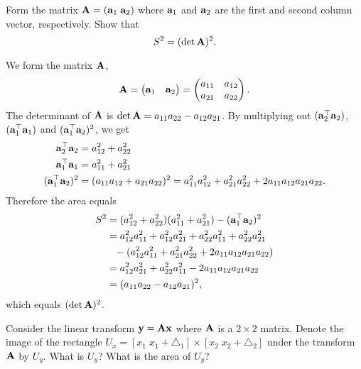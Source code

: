 \begin{exenumerate}
\begin{solution}
  \end{solution}
  
\item Form the matrix $\mathbf{A}=(\mathbf{a}_1 \; \mathbf{a}_2)$ where $\mathbf{a}_1$ and $\mathbf{a}_2$ are
  the first and second column vector, respectively. Show that
  \begin{equation}
    S^2 = (\det \mathbf{A})^2.
  \end{equation}
  
  
  \begin{solution}
    We form the matrix $\mathbf{A}$,
    \begin{equation}
      \mathbf{A} = \begin{pmatrix} \mathbf{a}_1 & \mathbf{a}_2
           \end{pmatrix}  =
           \begin{pmatrix} a_{11} & a_{12} \\ a_{21} & a_{22}
           \end{pmatrix}.
    \end{equation}
    The determinant of $\mathbf{A}$ is $\det \mathbf{A} = a_{11}a_{22} - a_{12}a_{21}$. By multiplying out $(\mathbf{a}_2^\top\mathbf{a}_2)$, $(\mathbf{a}_1^\top\mathbf{a}_1)$ and 
    $(\mathbf{a}_1^\top\mathbf{a}_2)^2$, we get
    \begin{align}
      \mathbf{a}_2^\top\mathbf{a}_2 	&= a_{12}^2 + a_{22}^2 \\ 
      \mathbf{a}_1^\top\mathbf{a}_1 	&= a_{11}^2 + a_{21}^2 \\
      (\mathbf{a}_1^\top\mathbf{a}_2)^2 	&= (a_{11}a_{12} + a_{21}a_{22})^2 = a_{11}^2a_{12}^2 + a_{21}^2a_{22}^2 + 2a_{11}a_{12}a_{21}a_{22}.
    \end{align}
    Therefore the area equals
    \begin{align}
      S^2 &= (a_{12}^2 + a_{22}^2)(a_{11}^2 + a_{21}^2) - (\mathbf{a}_1^\top\mathbf{a}_2)^2 \\
          &= a_{12}^2a_{11}^2 + a_{12}^2a_{21}^2 + a_{22}^2a_{11}^2 + a_{22}^2a_{21}^2 \nonumber\\
          &\phantom{=}- (a_{12}^2a_{11}^2 + a_{21}^2a_{22}^2 + 2a_{11}a_{12}a_{21}a_{22}) \\
          &= a_{12}^2a_{21}^2 + a_{22}^2a_{11}^2 - 2a_{11}a_{12}a_{21}a_{22} \\
          &= (a_{11}a_{22} - a_{12}a_{21})^2,
    \end{align}
    which equals $(\det \mathbf{A})^2$.
  \end{solution}
\item Consider the linear transform $\mathbf{y}=\mathbf{A}\mathbf{x}$ where $\mathbf{A}$
  is a $2 \times 2$ matrix. Denote the image of the rectangle $U_x=[x_1 \;
  x_1+\triangle_1]\times [x_2 \; x_2+\triangle_2]$ under the transform
  $\mathbf{A}$ by $U_y$. What is $U_y$? What is the area of $U_y$?
  

\end{exenumerate}
